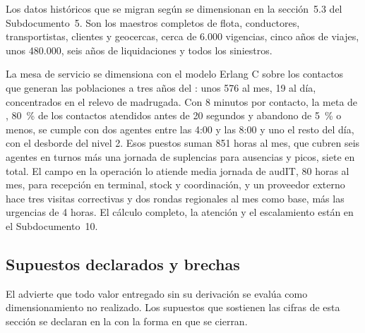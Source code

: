 Los datos históricos que se migran según  se dimensionan en la sección~5.3 del
Subdocumento~5. Son los maestros completos de flota, conductores, transportistas, clientes y
geocercas, cerca de 6.000 vigencias, cinco años de viajes, unos 480.000, seis años de liquidaciones y
todos los siniestros.

La mesa de servicio se dimensiona con el modelo Erlang C sobre los contactos que generan las
poblaciones a tres años del : unos 576 al mes, 19 al día, concentrados en el
relevo de madrugada. Con 8 minutos por contacto, la meta de , 80~\% de los
contactos atendidos antes de 20 segundos y abandono de 5~\% o menos, se cumple con dos agentes entre
las 4:00 y las 8:00 y uno el resto del día, con el desborde del nivel 2. Esos puestos suman 851 horas
al mes, que cubren seis agentes en turnos más una jornada de suplencias para ausencias y picos, siete
en total. El campo en la operación lo atiende media jornada de audIT, 80 horas al mes, para recepción en
terminal, stock y coordinación, y un proveedor externo hace tres visitas correctivas y dos rondas regionales al mes como
base, más las urgencias de 4 horas. El cálculo completo, la atención y el escalamiento están en el
Subdocumento~10.

\subsection{Supuestos declarados y brechas}\label{sec:4-supuestos}

El  advierte que todo valor entregado sin su derivación se evalúa como
dimensionamiento no realizado. Los supuestos que sostienen las cifras de esta sección se declaran en la
 con la forma en que se cierran.

